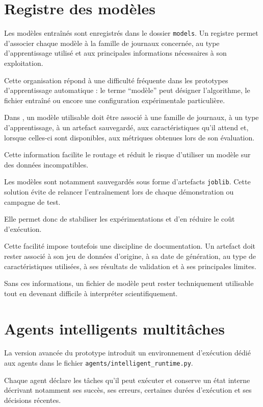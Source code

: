 \section{Registre des modèles}

Les modèles entraînés sont enregistrés dans le dossier \texttt{models}. Un registre permet d'associer chaque modèle à la famille de journaux concernée, au type d'apprentissage utilisé et aux principales informations nécessaires à son exploitation.

Cette organisation répond à une difficulté fréquente dans les prototypes d'apprentissage automatique : le terme ``modèle'' peut désigner l'algorithme, le fichier entraîné ou encore une configuration expérimentale particulière.

Dans \logminer{}, un modèle utilisable doit être associé à une famille de journaux, à un type d'apprentissage, à un artefact sauvegardé, aux caractéristiques qu'il attend et, lorsque celles-ci sont disponibles, aux métriques obtenues lors de son évaluation.

Cette information facilite le routage et réduit le risque d'utiliser un modèle sur des données incompatibles.

Les modèles sont notamment sauvegardés sous forme d'artefacts \texttt{joblib}. Cette solution évite de relancer l'entraînement lors de chaque démonstration ou campagne de test.

Elle permet donc de stabiliser les expérimentations et d'en réduire le coût d'exécution.

Cette facilité impose toutefois une discipline de documentation. Un artefact doit rester associé à son jeu de données d'origine, à sa date de génération, au type de caractéristiques utilisées, à ses résultats de validation et à ses principales limites.

Sans ces informations, un fichier de modèle peut rester techniquement utilisable tout en devenant difficile à interpréter scientifiquement.

\section{Agents intelligents multitâches}

La version avancée du prototype introduit un environnement d'exécution dédié aux agents dans le fichier \texttt{agents/intelligent\_runtime.py}.

Chaque agent déclare les tâches qu'il peut exécuter et conserve un état interne décrivant notamment ses succès, ses erreurs, certaines durées d'exécution et ses décisions récentes.

